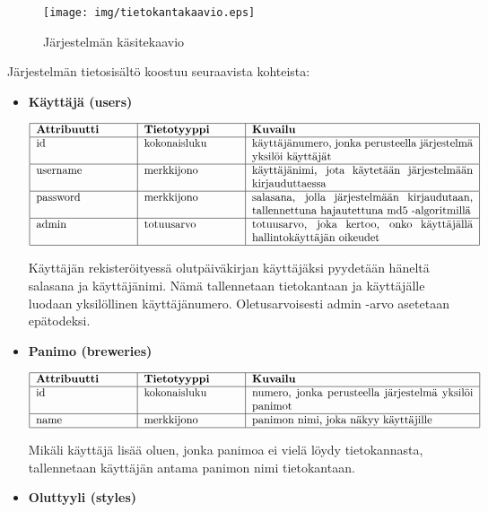 \documentclass[12pt]{article}
\begin{document}
\begin{figure}[H]
  \centering
  \texttt{[image: img/tietokantakaavio.eps]}
  \caption{Järjestelmän käsitekaavio}
\end{figure}

Järjestelmän tietosisältö koostuu seuraavista kohteista:

\begin{itemize}
\item \textbf{Käyttäjä (users)}

\[
  \begin{tabular}{|p{3cm}|p{3cm}|p{7cm}|}\hline
   \textbf{Attribuutti} & \textbf{Tietotyyppi} & \textbf{Kuvailu} \\ \hline
    id & kokonaisluku & käyttäjänumero, jonka perusteella järjestelmä yksilöi käyttäjät \\ \hline
    username & merkkijono & käyttäjänimi, jota käytetään järjestelmään kirjauduttaessa \\ \hline
    password & merkkijono & salasana, jolla järjestelmään kirjaudutaan, tallennettuna hajautettuna md5 -algoritmillä\\ \hline
    admin & totuusarvo & totuusarvo, joka kertoo, onko käyttäjällä hallintokäyttäjän oikeudet\\ \hline
  \end{tabular}
\]

Käyttäjän rekisteröityessä olutpäiväkirjan käyttäjäksi pyydetään häneltä salasana ja käyttäjänimi. Nämä tallennetaan tietokantaan ja käyttäjälle luodaan yksilöllinen käyttäjänumero. Oletusarvoisesti admin -arvo asetetaan epätodeksi.

\item \textbf{Panimo (breweries)}

\[
  \begin{tabular}{|p{3cm}|p{3cm}|p{7cm}|}\hline
   \textbf{Attribuutti} & \textbf{Tietotyyppi} & \textbf{Kuvailu} \\ \hline
    id & kokonaisluku & numero, jonka perusteella järjestelmä yksilöi panimot \\ \hline
    name & merkkijono & panimon nimi, joka näkyy käyttäjille \\ \hline
  \end{tabular}
\]

Mikäli käyttäjä lisää oluen, jonka panimoa ei vielä löydy tietokannasta, tallennetaan käyttäjän antama panimon nimi tietokantaan.

\item \textbf{Oluttyyli (styles)}


\end{itemize}
\end{document}
